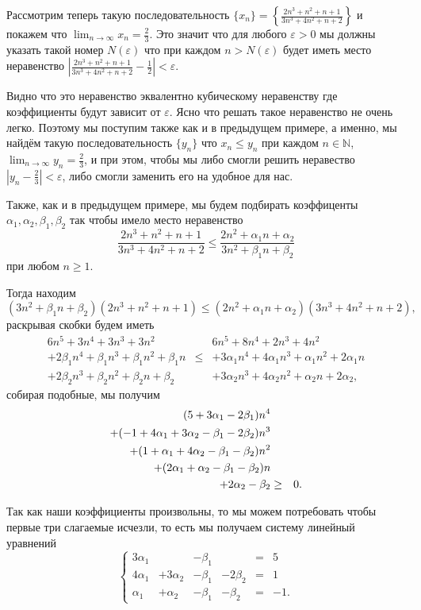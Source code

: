 \begin{example}
Рассмотрим теперь такую последовательность $\{x_n\} = \left\{ \frac{2n^3 +n^2+n+1}{3n^3+4n^2+n +2} \right\}$ и покажем что $\lim_{n\to \infty}x_n = \frac{2}{3}$. Это значит что для любого $\varepsilon>0$ мы должны указать такой номер $N(\varepsilon)$ что при каждом $n>N(\varepsilon)$ будет иметь место неравенство $\left| \frac{2n^3 +n^2+n+1}{3n^3+4n^2+n +2} -\frac{1}{2}\right|<\varepsilon.$

Видно что это неравенство эквалентно кубическому неравенству где коэффициенты будут зависит от $\varepsilon$. Ясно что решать такое неравенство не очень легко. Поэтому мы поступим также как и в предыдущем примере, а именно, мы найдём такую последовательность $\{y_n\}$ что $x_n \le y_n$ при каждом $n\in \mathbb{N}$, $\lim_{n \to \infty} y_n = \frac{2}{3}$, и при этом, чтобы мы либо смогли решить неравество $|y_n - \frac{2}{3}|<\varepsilon$, либо смогли заменить его на удобное для нас. 

Также, как и в предыдущем примере, мы будем подбирать коэффиценты $\alpha_1,\alpha_2,\beta_1,\beta_2$ так чтобы имело место неравенство
\[
 \frac{2n^3 +n^2+n+1}{3n^3+4n^2+n +2} \le \frac{2n^2 + \alpha_1 n +\alpha_2}{3n^2 + \beta_1n +\beta_2}
\]
при любом $n\ge 1.$

Тогда находим
\[
(3n^2 + \beta_1 n + \beta_2)(2n^3 + n^2 +n + 1) \le (2n^2 + \alpha_1 n + \alpha_2) (3n^3 + 4n^2 +n+2),
\]
раскрывая скобки будем иметь
\begin{eqnarray*}
    6n^5 + 3n^4 + 3n^3 + 3n^2 & & 6n^5 + 8n^4 +2n^3 + 4n^2 \\
    +2\beta_1 n^4 + \beta_1n^3 + \beta_1 n^2 +\beta_1 n & \le & +3\alpha_1n^4 + 4\alpha_1n^3 + \alpha_1n^2 + 2\alpha_1n \\
    +2\beta_2n^3 + \beta_2 n^2 + \beta_2 n + \beta_2 && +3\alpha_2n^3 + 4\alpha_2n^2 + \alpha_2n + 2\alpha_2,
    \end{eqnarray*}
собирая подобные, мы получим
\begin{eqnarray}\label{1}
 (5 + 3 \alpha_1 -2\beta_1) n^4 && \notag\\
 + (-1 + 4\alpha_1 + 3\alpha_2 - \beta_1 - 2 \beta_2)n^3 && \notag\\
 +(1+\alpha_1 + 4\alpha_2-\beta_1 -\beta_2)n^2 && \\
 +(2\alpha_1 + \alpha_2 - \beta_1 - \beta_2)n && \notag\\
 + 2\alpha_2 - \beta_2 &\ge & 0 \notag.
\end{eqnarray}

Так как наши коэффициенты произвольны, то мы можем потребовать чтобы первые три слагаемые исчезли, то есть мы получаем систему линейный уравнений
\[ \left\{
\begin{matrix}
    3\alpha_1 & & -\beta_1 & &=& 5 \\
    4 \alpha_1 & + 3 \alpha_2 & -\beta_1 & -2\beta_2 &=&1 \\
    \alpha_1 &+ \alpha_2 & -\beta_1 & -\beta_2 &=& -1.
\end{matrix} 
\right.
\]


\end{example}
